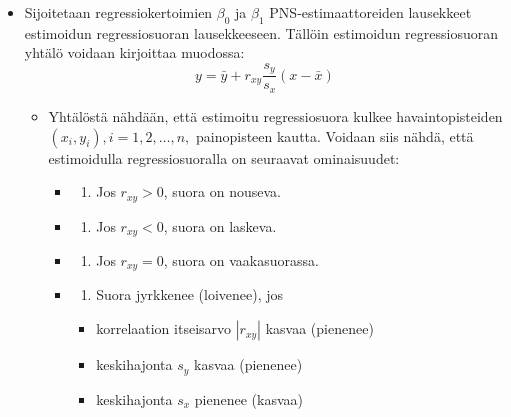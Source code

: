 \documentclass[
]{book}
\providecommand{\tightlist}{%
  \setlength{\itemsep}{0pt}\setlength{\parskip}{0pt}}
\begin{document}
\hfill\break

\begin{itemize}
\item
  Sijoitetaan regressiokertoimien \(\beta_0\) ja \(\beta_1\) PNS-estimaattoreiden lausekkeet estimoidun regressiosuoran lausekkeeseen. Tällöin estimoidun regressiosuoran yhtälö voidaan kirjoittaa muodossa:
  \[
  y = \bar{y} + r_{xy} \frac{s_y}{s_x} (x-\bar{x})
  \]

  \begin{itemize}
  \tightlist
  \item
    Yhtälöstä nähdään, että estimoitu regressiosuora kulkee havaintopisteiden \((x_i , y_i), i = 1,2, \ldots, n,\) painopisteen kautta. Voidaan siis nähdä, että estimoidulla regressiosuoralla on seuraavat ominaisuudet:

    \begin{itemize}
    \item
      \begin{enumerate}
      \def\labelenumi{(\roman{enumi})}
      \tightlist
      \item
        Jos \(r_{xy} > 0\), suora on nouseva.
      \end{enumerate}
    \item
      \begin{enumerate}
      \def\labelenumi{(\roman{enumi})}
      \setcounter{enumi}{1}
      \tightlist
      \item
        Jos \(r_{xy} < 0\), suora on laskeva.
      \end{enumerate}
    \item
      \begin{enumerate}
      \def\labelenumi{(\roman{enumi})}
      \setcounter{enumi}{2}
      \tightlist
      \item
        Jos \(r_{xy} = 0\), suora on vaakasuorassa.
      \end{enumerate}
    \item
      \begin{enumerate}
      \def\labelenumi{(\roman{enumi})}
      \setcounter{enumi}{3}
      \tightlist
      \item
        Suora jyrkkenee (loivenee), jos
      \end{enumerate}

      \begin{itemize}
      \tightlist
      \item
        korrelaation itseisarvo \(|r_{xy}|\) kasvaa (pienenee)
      \item
        keskihajonta \(s_y\) kasvaa (pienenee)
      \item
        keskihajonta \(s_x\) pienenee (kasvaa)
      \end{itemize}
    \end{itemize}
  \end{itemize}
\end{itemize}
\end{document}
